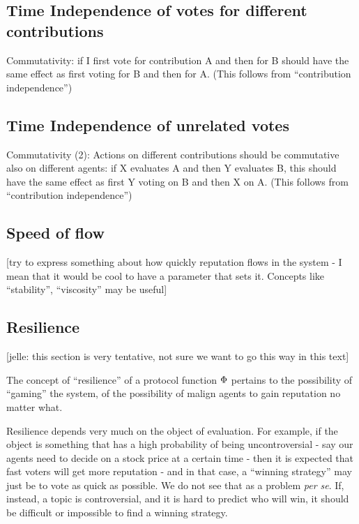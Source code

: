 \documentclass{article}
\begin{document}
\subsection{Time Independence of votes for different contributions}


Commutativity: if I first vote for contribution A and then for B should have the same effect as first voting for B and then for A.
(This follows from ``contribution independence'')

\subsection{Time Independence of unrelated votes}


Commutativity (2): Actions on different contributions should be commutative also on different agents: 
if X evaluates A and then Y evaluates B, this should have the same effect as first Y voting on B and then X on A.
(This follows from ``contribution independence'')

\subsection{Speed of flow}

[try to express something about how quickly reputation flows in the system - I mean that it would be cool to have a parameter that sets it. Concepts like ``stability'', ``viscosity'' may be useful]

\subsection{Resilience}

[jelle: this section is very tentative, not sure we want to go this way in this text]

The concept of ``resilience'' of a protocol function $\Phi$ pertains to the possibility of ``gaming'' the system, of the possibility of malign agents to gain reputation no matter what.

Resilience depends very much on the object of evaluation. For example, if the object is something that has a high probability of being uncontroversial - say our agents need to decide on a stock price at a certain time - then it is expected that fast voters will get more reputation - and in that case, a ``winning strategy'' may just be to vote as quick as possible. We do not see that as a problem {\em per se}.
If, instead, a topic is controversial, and it is hard to predict who will win, it should be difficult or impossible to find a winning strategy. 
\end{document}
